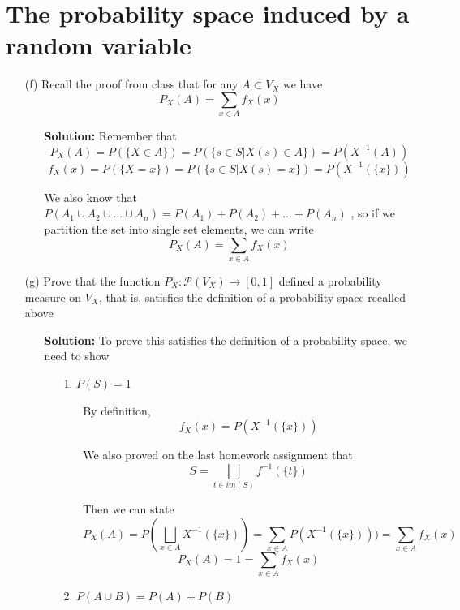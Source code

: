 \documentclass[hidelinks]{article}
\begin{document}
\section{The probability space induced by a random variable}
\begin{itemize}
    \item[(f)] Recall the proof from class that for any $A \subset V_X$ we have $$P_X(A) = \sum_{x \in A} f_X(x)$$ 
   \begin{itemize}
       \item[ ] \textbf{Solution:} Remember that 
           \[
            P_X(A) = P(\{X\in A\}) = P(\{s \in S | X(s) \in A\}) = P(X^{-1}(A))
           \]
           \[
               f_X(x) = P(\{X = x\} ) = P(\{s \in S | X(s) = x\}) = P(X^{-1}(\{x\}))
           \]
       \item[ ] We also know that $P(A_1 \cup A_2 \cup ... \cup A_n) = P(A_1) + P(A_2) + ... + P(A_n)$ 
           , so if we partition the set into single set elements, we can write
           \[
               P_X(A) = \sum_{x \in A} f_X(x)
           \]
   \end{itemize}
    \item[(g)] Prove that the function $P_X: \mathcal{P}(V_X) \rightarrow [0, 1]$ defined a probability measure on $V_X$, that is, satisfies the definition of a probability space recalled above 
   \begin{itemize}
       \item[ ] \textbf{Solution:} To prove this satisfies the definition of a probability space, we need to show 
       \begin{itemize}
            \item[1.] $P(S) = 1$
            \begin{itemize}
                \item[ ] By definition,  
                \[
                    f_X(x) = P(X^{-1}(\{x\})) 
                \]
                \item[ ] We also proved on the last homework assignment that 
                \[
                    S = \bigsqcup_{t \in im(S)} f^{-1}(\{t\})
                \]
            \item[ ] Then we can state 
                \[
                    P_X(A) = P(\bigsqcup_{x \in A} X^{-1}(\{x\})) = \sum_{x \in A} P(X^{-1}(\{x\})))= \sum_{x \in A} f_X(x)
                \]
                \[
                P_X(A)  =  1 = \sum_{x \in A} f_X(x)
                \]
            \end{itemize}
            \item[2.] $P(A \cup B) = P(A) + P(B)$

\end{itemize}
\end{itemize}
\end{itemize}
\end{document}
